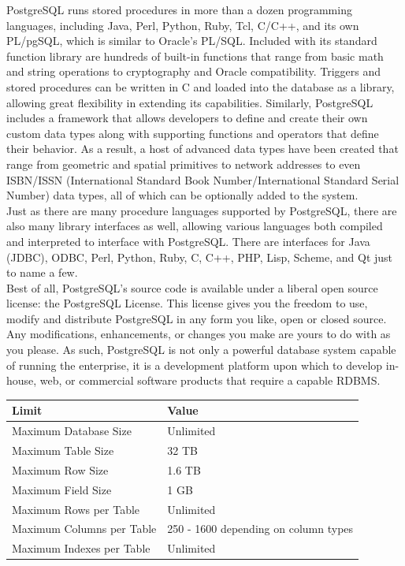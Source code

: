 PostgreSQL runs stored procedures in more than a dozen programming languages, including Java, Perl, Python, Ruby, Tcl, C/C++, and its own PL/pgSQL, which is similar to Oracle's PL/SQL. Included with its standard function library are hundreds of built-in functions that range from basic math and string operations to cryptography and Oracle compatibility. Triggers and stored procedures can be written in C and loaded into the database as a library, allowing great flexibility in extending its capabilities. Similarly, PostgreSQL includes a framework that allows developers to define and create their own custom data types along with supporting functions and operators that define their behavior. As a result, a host of advanced data types have been created that range from geometric and spatial primitives to network addresses to even ISBN/ISSN (International Standard Book Number/International Standard Serial Number) data types, all of which can be optionally added to the system.\\

Just as there are many procedure languages supported by PostgreSQL, there are also many library interfaces as well, allowing various languages both compiled and interpreted to interface with PostgreSQL. There are interfaces for Java (JDBC), ODBC, Perl, Python, Ruby, C, C++, PHP, Lisp, Scheme, and Qt just to name a few.\\

Best of all, PostgreSQL's source code is available under a liberal open source license: the PostgreSQL License. This license gives you the freedom to use, modify and distribute PostgreSQL in any form you like, open or closed source. Any modifications, enhancements, or changes you make are yours to do with as you please. As such, PostgreSQL is not only a powerful database system capable of running the enterprise, it is a development platform upon which to develop in-house, web, or commercial software products that require a capable RDBMS.\\


\begin{center}
\begin{tabular}{|l|l|}
\hline \textbf{Limit} & \textbf{Value}\\ \hline
Maximum Database Size & Unlimited\\
Maximum Table Size & 32 TB\\
Maximum Row Size & 1.6 TB\\
Maximum Field Size & 1 GB\\
Maximum Rows per Table & Unlimited\\
Maximum Columns per Table & 250 - 1600 depending on column types\\
Maximum Indexes per Table & Unlimited\\ \hline
\end{tabular}
\end{center}


